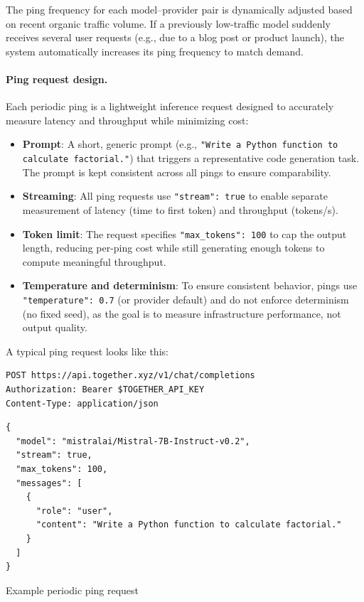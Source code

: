 \documentclass[english]{article}
\begin{document}
The ping frequency for each model–provider pair is dynamically adjusted based on recent organic traffic volume. If a previously low-traffic model suddenly receives several user requests (e.g., due to a blog post or product launch), the system automatically increases its ping frequency to match demand.

\paragraph{Ping request design.}

Each periodic ping is a lightweight inference request designed to accurately measure latency and throughput while minimizing cost:
\begin{itemize}
    \item \textbf{Prompt}: A short, generic prompt (e.g., \texttt{"Write a Python function to calculate factorial."}) that triggers a representative code generation task. The prompt is kept consistent across all pings to ensure comparability.
    \item \textbf{Streaming}: All ping requests use \texttt{"stream": true} to enable separate measurement of latency (time to first token) and throughput (tokens/s).
    \item \textbf{Token limit}: The request specifies \texttt{"max\_tokens": 100} to cap the output length, reducing per-ping cost while still generating enough tokens to compute meaningful throughput.
    \item \textbf{Temperature and determinism}: To ensure consistent behavior, pings use \texttt{"temperature": 0.7} (or provider default) and do not enforce determinism (no fixed seed), as the goal is to measure infrastructure performance, not output quality.
\end{itemize}

A typical ping request looks like this:

\begin{listing}[H]
\begin{verbatim}
POST https://api.together.xyz/v1/chat/completions
Authorization: Bearer $TOGETHER_API_KEY
Content-Type: application/json
\end{verbatim}
\begin{verbatim}
{
  "model": "mistralai/Mistral-7B-Instruct-v0.2",
  "stream": true,
  "max_tokens": 100,
  "messages": [
    {
      "role": "user",
      "content": "Write a Python function to calculate factorial."
    }
  ]
}
\end{verbatim}
\caption{Example periodic ping request}
\end{listing}
\end{document}
